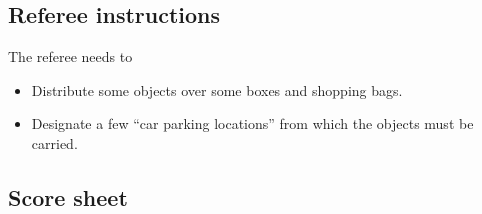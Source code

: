\subsection{Referee instructions}

The referee needs to
\begin{itemize}
\item Distribute some objects over some boxes and shopping bags.
\item Designate a few ``car parking locations'' from which the objects must be carried.
\end{itemize}

\subsection{Score sheet}
